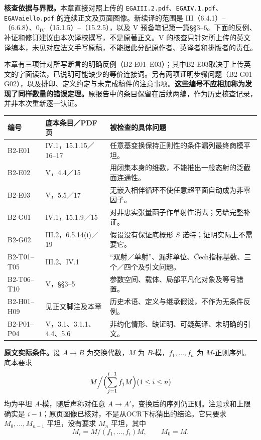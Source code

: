 \noindent\textbf{核查依据与界限。}本章直接对照上传的 \texttt{EGAIII.2.pdf}、\texttt{EGAIV.1.pdf}、\texttt{EGAVaiello.pdf} 的连续正文及页面图像。新续译的范围是 III（6.4.1）--（6.6.8）、$0_{\mathrm{IV}}$（15.1.5）--（15.2.5），以及 V 预备笔记第一篇§§3--6。下面的反例、补证和修订建议由本次译校撰写，不是原著正文。V 的核查只针对所上传的英文译编本，未见对应法文手写原稿，不能据此分配原作者、英译者和排版者的责任。

本章有三项针对所写断言的明确反例（B2-E01--E03）；其中B2-E03取决于上传英文的字面读法，已说明可能缺少的等价连接词。另有两项证明步骤问题（B2-G01--G02），以及排印、定义约定与未完成稿件的注意事项。\textbf{这些编号不应相加称为发现了同样数量的错误定理。}原报告中的条目保留在后续两编，作为历史核查记录，并非本次重新逐一认证。

\begin{longtable}{@{}p{}p{}p{}@{}}
\toprule 编号 & 底本条目／PDF页 & 被检查的具体问题\\\midrule\endhead
B2-E01 & IV.1，15.1.15／16--17 & 任意基变换保持正则性的条件漏列最终商模平坦。\\
B2-E02 & V，4.4／15 & 用闭集本身的维数，不能推出一般态射的泛截面连通性。\\
B2-E03 & V，5.5／17 & 无嵌入相伴循环不使任意超平面自动成为非零因子。\\
B2-G01 & IV.1，15.1.9／15 & 对非忠实张量函子作单射性消去；另给完整补证。\\
B2-G02 & III.2，6.5.14(i)／19 & 假设没有保证底概形 $S$ 诺特；证明实际上不需要它。\\
B2-T01--T05 & III.2、IV.1 & “双射／单射”、漏非单位、Čech指标基数、三个／四个及引文问题。\\
B2-T06--T10 & V，§§3--5 & 参数空间、载体、局部平凡化对象及等号错置。\\
B2-H01--H09 & 见正文脚注及本章 & 历史术语、定义与继承假设，不作为无条件反例。\\
B2-P01--P04 & V，3.1、3.1.1、4.4、5.6 & 非约化情形、缺证明、可疑英译、未明确的引文。\\
\bottomrule
\end{longtable}

\textbf{原文实际条件。}设 $A\to B$ 为交换代数，$M$ 为 $B$-模，$f_1,\ldots,f_n$ 为 $M$-正则序列。底本要求
\[
 M\Big/\Bigl(\sum_{j=1}^{i-1}f_jM\Bigr)
 \quad(1\leq i\leq n)
\]
均为平坦 $A$-模，随后声称对任意 $A\to A'$，变换后的序列仍正则。注意求和上限确实是 $i-1$；原页图像已核对，不是从OCR下标猜出的结论。它只要求 $M_0,\ldots,M_{n-1}$ 平坦，没有要求 $M_n$ 平坦，其中
\[
 M_i=M/(f_1,\ldots,f_i)M,
 \qquad M_0=M.
\]

